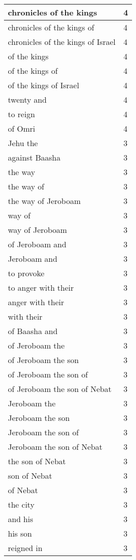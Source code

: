 \begin{center}
\begin{longtable}{|p{3.0in}|p{0.5in}|}
chronicles of the kings & 4\\ \hline 
chronicles of the kings of & 4\\ \hline 
chronicles of the kings of Israel & 4\\ \hline 
of the kings & 4\\ \hline 
of the kings of & 4\\ \hline 
of the kings of Israel & 4\\ \hline 
twenty and & 4\\ \hline 
to reign & 4\\ \hline 
of Omri & 4\\ \hline 
Jehu the & 3\\ \hline 
against Baasha & 3\\ \hline 
the way & 3\\ \hline 
the way of & 3\\ \hline 
the way of Jeroboam & 3\\ \hline 
way of & 3\\ \hline 
way of Jeroboam & 3\\ \hline 
of Jeroboam and & 3\\ \hline 
Jeroboam and & 3\\ \hline 
to provoke & 3\\ \hline 
to anger with their & 3\\ \hline 
anger with their & 3\\ \hline 
with their & 3\\ \hline 
of Baasha and & 3\\ \hline 
of Jeroboam the & 3\\ \hline 
of Jeroboam the son & 3\\ \hline 
of Jeroboam the son of & 3\\ \hline 
of Jeroboam the son of Nebat & 3\\ \hline 
Jeroboam the & 3\\ \hline 
Jeroboam the son & 3\\ \hline 
Jeroboam the son of & 3\\ \hline 
Jeroboam the son of Nebat & 3\\ \hline 
the son of Nebat & 3\\ \hline 
son of Nebat & 3\\ \hline 
of Nebat & 3\\ \hline 
the city & 3\\ \hline 
and his & 3\\ \hline 
his son & 3\\ \hline 
reigned in & 3\\ \hline 

\end{longtable}
\end{center}

